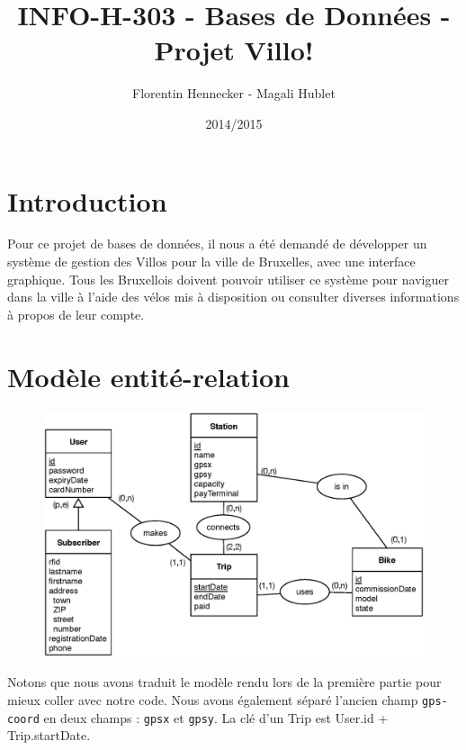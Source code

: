 \documentclass[a4paper]{article}
\title{INFO-H-303 - Bases de Données - Projet Villo!}
\author{Florentin Hennecker - Magali Hublet}
\date{2014/2015}
\begin{document}
\maketitle
\tableofcontents

\section{Introduction}

Pour ce projet de bases de données, il nous a été demandé de développer un système de gestion des Villos pour la ville de Bruxelles, avec une interface graphique. Tous les Bruxellois doivent pouvoir utiliser ce système pour naviguer dans la ville à l'aide des vélos mis à disposition ou consulter diverses informations à propos de leur compte.


\section{Modèle entité-relation}

\begin{figure}[H]
\includegraphics[width=\textwidth]{ERSchema.eps}
\end{figure}

Notons que nous avons traduit le modèle rendu lors de la première partie pour mieux coller avec notre code. Nous avons également séparé l'ancien champ \texttt{gps-coord} en deux champs : \texttt{gpsx} et \texttt{gpsy}. La clé d'un Trip est User.id + Trip.startDate.
\end{document}
